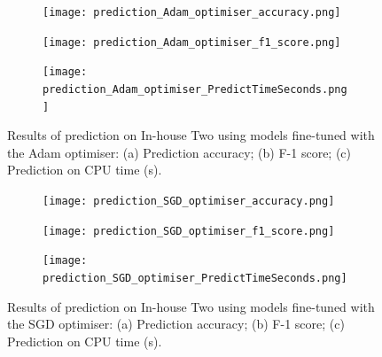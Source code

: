 \documentclass[a4paper,12pt]{article}
\newcommand{\figwidthh}{0.48\textwidth}
\begin{document}
\begin{figure}[p] 
	\begin{center}
		\begin{subfigure}[b]{\figwidthh}
			\caption{} 
			\texttt{[image: prediction\_Adam\_optimiser\_accuracy.png]}
		\end{subfigure}
        \hfill
		\begin{subfigure}[b]{\figwidthh}
			\caption{}
			\texttt{[image: prediction\_Adam\_optimiser\_f1\_score.png]}
		\end{subfigure}
        \hfill
		\begin{subfigure}[b]{\figwidthh}
			\caption{}
			\texttt{[image: prediction\_Adam\_optimiser\_PredictTimeSeconds.png]}
		\end{subfigure}
	\end{center}
	\caption{Results of prediction on In-house Two using models fine-tuned with the Adam optimiser: 
	(a) Prediction accuracy; (b) F-1 score; (c) Prediction on CPU time (s).
	} 
	\label{fig:res_prdict_adam}
\end{figure}

\begin{figure}[p] 
	\begin{center}
		\begin{subfigure}[b]{\figwidthh}
			\caption{} 
			\texttt{[image: prediction\_SGD\_optimiser\_accuracy.png]}
		\end{subfigure}
        \hfill
		\begin{subfigure}[b]{\figwidthh}
			\caption{}
			\texttt{[image: prediction\_SGD\_optimiser\_f1\_score.png]}
		\end{subfigure}
        \hfill
		\begin{subfigure}[b]{\figwidthh}
			\caption{}
			\texttt{[image: prediction\_SGD\_optimiser\_PredictTimeSeconds.png]}
		\end{subfigure}
	\end{center}
	\caption{Results of prediction on In-house Two using models fine-tuned with the SGD optimiser: 
	(a) Prediction accuracy; (b) F-1 score; (c) Prediction on CPU time (s).
	} 
	\label{fig:res_predict_SGD}
\end{figure}
\end{document}
